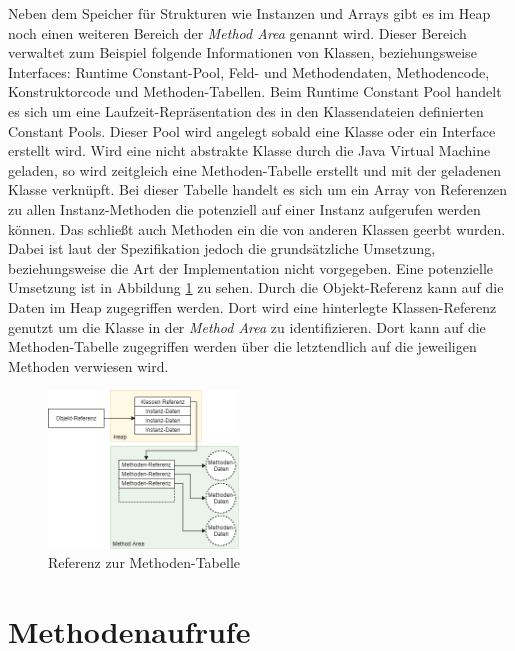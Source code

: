 \documentclass[conference]{IEEEtran}
\begin{document}
Neben dem Speicher für Strukturen wie Instanzen und Arrays gibt es im Heap noch einen weiteren Bereich der \textit{Method Area} genannt wird. Dieser Bereich verwaltet zum Beispiel folgende Informationen von Klassen, beziehungsweise Interfaces: Runtime Constant-Pool, Feld- und Methodendaten, Methodencode, Konstruktorcode und Methoden-Tabellen. Beim Runtime Constant Pool handelt es sich um eine Laufzeit-Repräsentation des in den Klassendateien definierten Constant Pools. Dieser Pool wird angelegt sobald eine Klasse oder ein Interface erstellt wird. Wird eine nicht abstrakte Klasse durch die Java Virtual Machine geladen, so wird zeitgleich eine Methoden-Tabelle erstellt und mit der geladenen Klasse verknüpft. Bei dieser Tabelle handelt es sich um ein Array von Referenzen zu allen Instanz-Methoden die potenziell auf einer Instanz aufgerufen werden können. Das schließt auch Methoden ein die von anderen Klassen geerbt wurden. Dabei ist laut der Spezifikation jedoch die grundsätzliche Umsetzung, beziehungsweise die Art der Implementation nicht vorgegeben. Eine potenzielle Umsetzung ist in Abbildung \ref{fig:linkZurMethodenTabelle} zu sehen. Durch die Objekt-Referenz kann auf die Daten im Heap zugegriffen werden. Dort wird eine hinterlegte Klassen-Referenz genutzt um die Klasse in der \textit{Method Area} zu identifizieren. Dort kann auf die Methoden-Tabelle zugegriffen werden über die letztendlich auf die jeweiligen Methoden verwiesen wird.
\begin{figure}[htbp] 
  \centering
     \includegraphics[width=0.45\textwidth]{Grafiken/LinkZurMethodenTabelle.png}
  \caption{Referenz zur Methoden-Tabelle}
  \label{fig:linkZurMethodenTabelle}
\end{figure}



\section{Methodenaufrufe}
\end{document}
